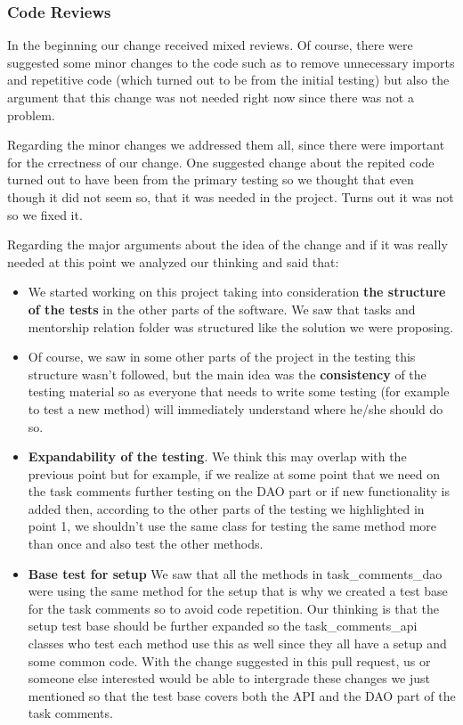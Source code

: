 \documentclass{article}
\begin{document}
\subsubsection{Code Reviews}
\hspace{0.5cm}In the beginning our change received mixed reviews. Of course, there were suggested some minor changes to the code such as to remove unnecessary imports and repetitive code (which turned out to be from the initial testing) but also the argument that this change was not needed right now since there was not a problem.

Regarding the minor changes we addressed them all, since there were important for the crrectness of our change. One suggested change about the repited code turned out to have been from the primary testing so we thought that even though it did not seem so, that it was needed in the project. Turns out it was not so we fixed it.

Regarding the major arguments about the idea of the change and if it was really needed at this point we analyzed our thinking and said that:
\begin{itemize}
\item We started working on this project taking into consideration \textbf{the structure of the tests} in the other parts of the software.
We saw that tasks and mentorship relation folder was structured like the solution we were proposing. 
\item Of course, we saw in some other parts of the project in the testing this structure wasn't followed, but the main idea was the \textbf{consistency} of the testing material so as everyone that needs to write some testing (for example to test a new method) will immediately understand where he/she should do so.
\item \textbf{Expandability of the testing}.
We think this may overlap with the previous point but for example, if we realize at some point that we need on the task comments further testing on the DAO part or if new functionality is added then, according to the other parts of the testing we highlighted in point 1, we shouldn't use the same class for testing the same method more than once and also test the other methods.
\item \textbf{Base test for setup}
We saw that all the methods in task\_comments\_dao were using the same method for the setup that is why we created a test base for the task comments so to avoid code repetition. Our thinking is that the setup test base should be further expanded so the task\_comments\_api classes who test each method use this as well since they all have a setup and some common code. With the change suggested in this pull request, us or someone else interested would be able to intergrade these changes we just mentioned so that the test base covers both the API and the DAO part of the task comments.
\end{itemize}
\end{document}
